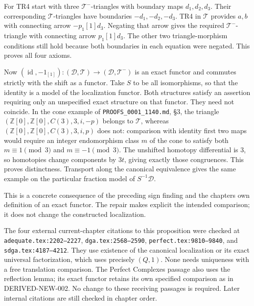 For TR4 start with three \(\mathcal T^-\)-triangles with boundary maps \(d_1,d_2,d_3\). Their corresponding \(\mathcal T\)-triangles have boundaries \(-d_1,-d_2,-d_3\). TR4 in \(\mathcal T\) provides \(a,b\) with connecting arrow \(-p_1[1]d_3\). Negating that arrow gives the required \(\mathcal T^-\)-triangle with connecting arrow \(p_1[1]d_3\). The other two triangle-morphism conditions still hold because both boundaries in each equation were negated. This proves all four axioms.

Now \((\operatorname{id},-1_{[1]}):
(\mathcal D,\mathcal T)\to(\mathcal D,\mathcal T^-)\) is an exact functor and commutes strictly with the shift as a functor. Take \(S\) to be all isomorphisms,\allowbreak{} so that the identity is a model of the localization functor. Both structures satisfy an assertion requiring only an unspecified exact structure on that functor. They need not coincide. In the cone example of \texttt{PROOFS\_\allowbreak{}0001\_\allowbreak{}1140.\allowbreak{}md},\allowbreak{} §3,\allowbreak{} the triangle \((\mathbb Z[0],\mathbb Z[0],C(3),3,i,-p)\) belongs to \(\mathcal T\),\allowbreak{} whereas \((\mathbb Z[0],\mathbb Z[0],C(3),3,i,p)\) does not:\allowbreak{} comparison with identity first two maps would require an integer endomorphism class \(m\) of the cone to satisfy both \(m\equiv1\pmod3\) and \(m\equiv-1\pmod3\). The unshifted homotopy differential is \(3\),\allowbreak{} so homotopies change components by \(3t\),\allowbreak{} giving exactly those congruences. This proves distinctness. Transport along the canonical equivalence gives the same example on the particular fraction model of \(S^{-1}\mathcal D\).

This is a concrete consequence of the preceding sign finding and the chapter\textquotesingle s own definition of an exact functor. The repair makes explicit the intended comparison; it does not change the constructed localization.

The four external current-chapter citations to this proposition were checked at \texttt{adequate.\allowbreak{}tex:\allowbreak{}2202–\allowbreak{}2227},\allowbreak{} \texttt{dga.\allowbreak{}tex:\allowbreak{}2568–\allowbreak{}2590},\allowbreak{} \texttt{perfect.\allowbreak{}tex:\allowbreak{}9810–\allowbreak{}9840},\allowbreak{} and \texttt{sdga.\allowbreak{}tex:\allowbreak{}4187–\allowbreak{}4212}. They use existence of the canonical localization or its exact universal factorization,\allowbreak{} which uses precisely \((Q,1)\). None needs uniqueness with a free translation comparison. The Perfect Complexes passage also uses the reflection lemma; its exact functor retains its own specified comparison as in DERIVED-NEW-002. No change to these receiving passages is required. Later internal citations are still checked in chapter order.

